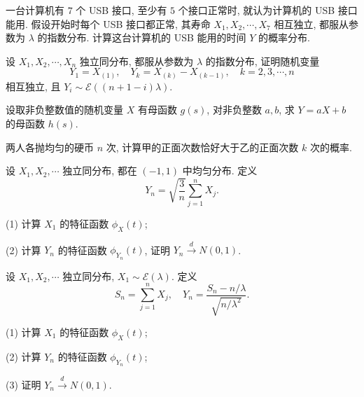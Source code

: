 \begin{exercise}[七个接口的第三次失效]\label{q:A6.17}
一台计算机有 $7$ 个 USB 接口, 至少有 $5$ 个接口正常时, 就认为计算机的 USB 接口能用. 假设开始时每个 USB 接口都正常, 其寿命 $X_1,X_2,\cdots,X_7$ 相互独立, 都服从参数为 $\lambda$ 的指数分布. 计算这台计算机的 USB 能用的时间 $Y$ 的概率分布.\par{}\end{exercise}

\begin{exercise}[指数顺序统计量的间隔]\label{q:A6.20}
设 $X_1,X_2,\cdots,X_n$ 独立同分布, 都服从参数为 $\lambda$ 的指数分布, 证明随机变量
    \[Y_1=X_{(1)},\quad Y_k=X_{(k)}-X_{(k-1)},\quad k=2,3,\cdots,n\]
    相互独立, 且 $Y_i\sim\mathcal{E}((n+1-i)\lambda)$.\par{}\end{exercise}

\begin{exercise}[仿射变换的概率母函数]\label{q:A6.21}
设取非负整数值的随机变量 $X$ 有母函数 $g(s)$, 对非负整数 $a,b$, 求 $Y=aX+b$ 的母函数 $h(s)$.\par{}\end{exercise}

\begin{exercise}[两组硬币成功数之差]\label{q:A6.24}
两人各抛均匀的硬币 $n$ 次, 计算甲的正面次数恰好大于乙的正面次数 $k$ 次的概率.\par{}\end{exercise}

\begin{exercise}[均匀和的特征函数极限]\label{q:A6.29}
设 $X_1,X_2,\cdots$ 独立同分布, 都在 $(-1,1)$ 中均匀分布. 定义
    \[Y_n=\sqrt{\dfrac{3}{n}}\sum\limits_{j=1}^nX_j.\]

    (1) 计算 $X_1$ 的特征函数 $\phi_X(t)$;

    (2) 计算 $Y_n$ 的特征函数 $\phi_{Y_n}(t)$, 证明 $Y_n\xrightarrow{d}N(0,1)$.\par{}\end{exercise}

\begin{exercise}[指数和的特征函数极限]\label{q:A6.30}
设 $X_1,X_2,\cdots$ 独立同分布, $X_1\sim\mathcal{E}(\lambda)$. 定义
    \[S_n=\sum\limits_{j=1}^nX_j,\quad Y_n=\dfrac{S_n-n/\lambda}{\sqrt{n/\lambda^2}}.\]

    (1) 计算 $X_1$ 的特征函数 $\phi_X(t)$;

    (2) 计算 $Y_n$ 的特征函数 $\phi_{Y_n}(t)$;

    (3) 证明 $Y_n\xrightarrow{d}N(0,1)$.\par{}\end{exercise}

